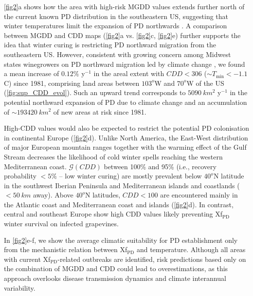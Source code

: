     \cref{fig2}a shows how the area with high-risk MGDD values extends further
    north of the current known PD distribution in the southeastern US,
    suggesting
    that winter temperatures limit the expansion of PD northwards
    \cite{Hopkins2002}. A comparison between MGDD and CDD maps (\cref{fig2}a
    vs.
    \cref{fig2}c, \cref{fig2}e) further supports the idea that winter curing is
    restricting PD northward migration from the southeastern US. However,
    consistent with growing concern among Midwest states winegrowers on PD
    northward migration led by climate change \cite{Galvez2010}, we found a
    mean
    increase of $0.12 \%$ y$^{-1}$ in the areal extent with $CDD < 306$ ($\sim
T_{\textrm{min}} < -1.1$ \textdegree C) since 1981, comprising land areas
    between $103^o$W and $70^o$W of the US (\cref{fig:sup_CDD_evol}). Such an
    upward
    trend corresponds to $\SI{5090}{km^2}$ y$^{-1}$ in the potential northward
    expansion of PD due to climate change and an accumulation of $\sim
\SI{193420}{km^2}$ of new areas at risk since 1981.

    High-CDD values would also be expected to restrict the potential PD
    colonisation in continental Europe (\cref{fig2}d). Unlike North America,
    the
    East-West distribution of major European mountain ranges together with the
    warming effect of the Gulf Stream decreases the likelihood of cold winter
    spells reaching the western Mediterranean coast. $\mathcal{G}(CDD)$ between
    100\% and 95\% (i.e., recovery probability $<5\%$ -- low winter curing) are
    mostly prevalent below $40^o$N latitude in the southwest Iberian Peninsula
    and
    Mediterranean islands and coastlands ($<\SI{50}{km}$ away). Above $40^o$N
    latitudes, $CDD < 100$ are encountered mainly in the Atlantic coast and
    Mediterranean coast and islands (\cref{fig2}d). In contrast, central and
    southeast Europe show high CDD values likely preventing Xf$_{\textrm{PD}}$
    winter survival on infected grapevines.

    In \cref{fig2}e-f, we show the average climatic suitability for PD
    establishment only from the mechanistic relation between Xf$_{\textrm{PD}}$
    and
    temperature. Although all areas with current Xf$_{\textrm{PD}}$-related
    outbreaks are identified, risk predictions based only on the combination of
    MGDD and CDD could lead to overestimations, as this approach overlooks
    disease
    transmission dynamics and climate interannual variability.

